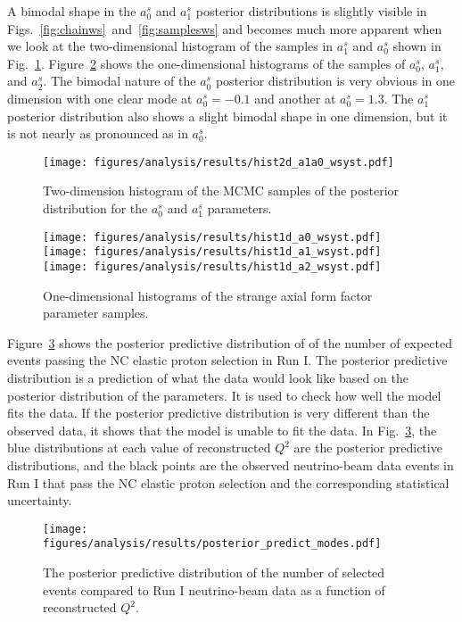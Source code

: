     A bimodal shape in the $a_0^s$ and $a_1^s$ posterior distributions is
    slightly visible in Figs.~\ref{fig:chainws}~and~\ref{fig:samplesws} and
    becomes much more apparent when we look at the two-dimensional histogram of
    the samples in $a_1^s$ and $a_0^s$ shown in Fig.~\ref{fig:hist2da1a0}.
    Figure~\ref{fig:hist1dws} shows the one-dimensional histograms of the
    samples of $a_0^s$, $a_1^s$, and $a_2^s$. The bimodal nature of the $a_0^s$
    posterior distribution is very obvious in one dimension with one clear mode
    at $a_0^s = -0.1$ and another at $a_0^s = 1.3$. The $a_1^s$ posterior
    distribution also shows a slight bimodal shape in one dimension, but it is
    not nearly as pronounced as in $a_0^s$.
    \begin{figure}[h]
      \centering
      \texttt{[image: figures/analysis/results/hist2d\_a1a0\_wsyst.pdf]} \\
      \caption{Two-dimension histogram of the MCMC samples of the posterior
      distribution for the $a_0^s$ and $a_1^s$ parameters.}
      \label{fig:hist2da1a0}
    \end{figure}
    \begin{figure}[h]
      \centering
      \texttt{[image: figures/analysis/results/hist1d\_a0\_wsyst.pdf]} 
      \texttt{[image: figures/analysis/results/hist1d\_a1\_wsyst.pdf]} 
      \texttt{[image: figures/analysis/results/hist1d\_a2\_wsyst.pdf]}
      \caption{One-dimensional histograms of the strange axial form factor
      parameter samples.}
      \label{fig:hist1dws}
    \end{figure}

    Figure~\ref{fig:postpred} shows the posterior predictive distribution of of
    the number of expected events passing the NC elastic proton selection in
    Run I. The posterior predictive distribution is a prediction of what the
    data would look like based on the posterior distribution of the parameters.
    It is used to check how well the model fits the data. If the posterior
    predictive distribution is very different than the observed data, it shows
    that the model is unable to fit the data. In Fig.~\ref{fig:postpred}, the
    blue distributions at each value of reconstructed $Q^2$ are the posterior
    predictive distributions, and the black points are the observed
    neutrino-beam data events in Run I that pass the NC elastic proton
    selection and the corresponding statistical uncertainty.
    \begin{figure}[h]
      \centering
      \texttt{[image: figures/analysis/results/posterior\_predict\_modes.pdf]} 
      \caption{The posterior predictive distribution of the number of selected
      events compared to Run I neutrino-beam data as a function of
      reconstructed $Q^2$.}
      \label{fig:postpred}
    \end{figure}

